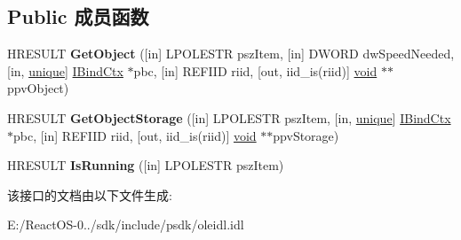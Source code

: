 \subsection*{Public 成员函数}
\begin{DoxyCompactItemize}
\item 
\mbox{\label{interface_i_ole_item_container_a3dc19b6c1aa2356bfec61a62c329c009}} 
H\+R\+E\+S\+U\+LT {\bfseries Get\+Object} (\mbox{[}in\mbox{]} L\+P\+O\+L\+E\+S\+TR psz\+Item, \mbox{[}in\mbox{]} D\+W\+O\+RD dw\+Speed\+Needed, \mbox{[}in, \hyperlink{interfaceunique}{unique}\mbox{]} \hyperlink{interface_i_bind_ctx}{I\+Bind\+Ctx} $\ast$pbc, \mbox{[}in\mbox{]} R\+E\+F\+I\+ID riid, \mbox{[}out, iid\+\_\+is(riid)\mbox{]} \hyperlink{interfacevoid}{void} $\ast$$\ast$ppv\+Object)
\item 
\mbox{\label{interface_i_ole_item_container_a9aaee009915f8732b36e977d75c07513}} 
H\+R\+E\+S\+U\+LT {\bfseries Get\+Object\+Storage} (\mbox{[}in\mbox{]} L\+P\+O\+L\+E\+S\+TR psz\+Item, \mbox{[}in, \hyperlink{interfaceunique}{unique}\mbox{]} \hyperlink{interface_i_bind_ctx}{I\+Bind\+Ctx} $\ast$pbc, \mbox{[}in\mbox{]} R\+E\+F\+I\+ID riid, \mbox{[}out, iid\+\_\+is(riid)\mbox{]} \hyperlink{interfacevoid}{void} $\ast$$\ast$ppv\+Storage)
\item 
\mbox{\label{interface_i_ole_item_container_a29c79638e5df50378ec3f83e28a23607}} 
H\+R\+E\+S\+U\+LT {\bfseries Is\+Running} (\mbox{[}in\mbox{]} L\+P\+O\+L\+E\+S\+TR psz\+Item)
\end{DoxyCompactItemize}


该接口的文档由以下文件生成\+:\begin{DoxyCompactItemize}
\item 
E\+:/\+React\+O\+S-\/0../sdk/include/psdk/oleidl.\+idl\end{DoxyCompactItemize}
